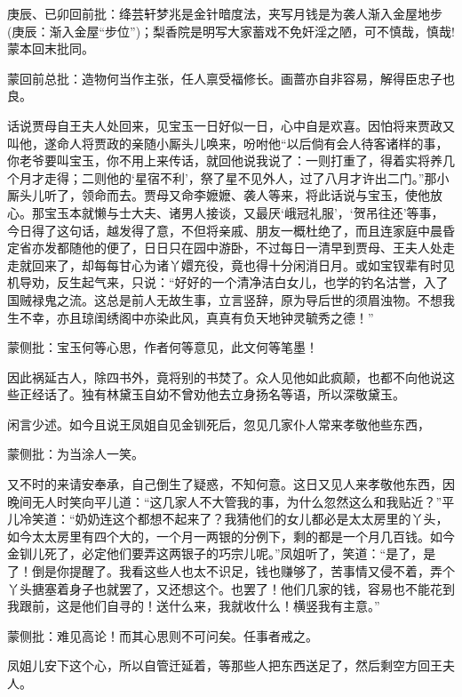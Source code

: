 
\begin{parag}
    \begin{note}庚辰、已卯回前批：绛芸轩梦兆是金针暗度法，夹写月钱是为袭人渐入金屋地步(庚辰：渐入金屋“步位”)；梨香院是明写大家蓄戏不免奸淫之陋，可不慎哉，慎哉!蒙本回末批同。\end{note}
\end{parag}


\begin{parag}
    \begin{note}蒙回前总批：造物何当作主张，任人禀受福修长。画蔷亦自非容易，解得臣忠子也良。\end{note}
\end{parag}


\begin{parag}
    话说贾母自王夫人处回来，见宝玉一日好似一日，心中自是欢喜。因怕将来贾政又叫他，遂命人将贾政的亲随小厮头儿唤来，吩咐他“以后倘有会人待客诸样的事，你老爷要叫宝玉，你不用上来传话，就回他说我说了：一则打重了，得着实将养几个月才走得；二则他的‘星宿不利’，祭了星不见外人，过了八月才许出二门。”那小厮头儿听了，领命而去。贾母又命李嬷嬷、袭人等来，将此话说与宝玉，使他放心。那宝玉本就懒与士大夫、诸男人接谈，又最厌‘峨冠礼服’，‘贺吊往还’等事，今日得了这句话，越发得了意，不但将亲戚、朋友一概杜绝了，而且连家庭中晨昏定省亦发都随他的便了，日日只在园中游卧，不过每日一清早到贾母、王夫人处走走就回来了，却每每甘心为诸丫嬛充役，竟也得十分闲消日月。或如宝钗辈有时见机导劝，反生起气来，只说：“好好的一个清净洁白女儿，也学的钓名沽誉，入了国贼禄鬼之流。这总是前人无故生事，立言竖辞，原为导后世的须眉浊物。不想我生不幸，亦且琼闺绣阁中亦染此风，真真有负天地钟灵毓秀之德！”\begin{note}蒙侧批：宝玉何等心思，作者何等意见，此文何等笔墨！\end{note}因此祸延古人，除四书外，竟将别的书焚了。众人见他如此疯颠，也都不向他说这些正经话了。独有林黛玉自幼不曾劝他去立身扬名等语，所以深敬黛玉。
\end{parag}


\begin{parag}
    闲言少述。如今且说王凤姐自见金钏死后，忽见几家仆人常来孝敬他些东西，\begin{note}蒙侧批：为当涂人一笑。\end{note}又不时的来请安奉承，自己倒生了疑惑，不知何意。这日又见人来孝敬他东西，因晚间无人时笑向平儿道：“这几家人不大管我的事，为什么忽然这么和我贴近？”平儿冷笑道：“奶奶连这个都想不起来了？我猜他们的女儿都必是太太房里的丫头，如今太太房里有四个大的，一个月一两银的分例下，剩的都是一个月几百钱。如今金钏儿死了，必定他们要弄这两银子的巧宗儿呢。”凤姐听了，笑道：“是了，是了！倒是你提醒了。我看这些人也太不识足，钱也赚够了，苦事情又侵不着，弄个丫头搪塞着身子也就罢了，又还想这个。也罢了！他们几家的钱，容易也不能花到我跟前，这是他们自寻的！送什么来，我就收什么！横竖我有主意。”\begin{note}蒙侧批：难见高论！而其心思则不可问矣。任事者戒之。\end{note}凤姐儿安下这个心，所以自管迁延着，等那些人把东西送足了，然后剩空方回王夫人。
\end{parag}


